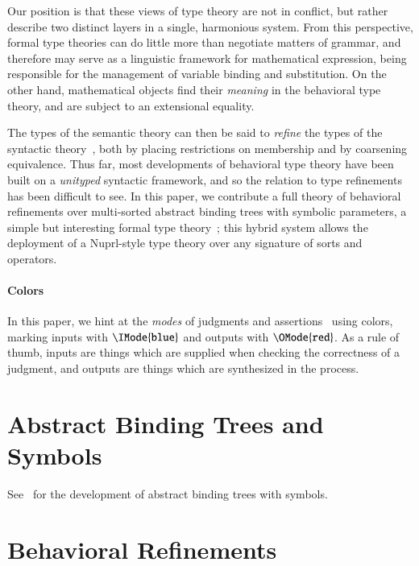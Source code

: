 \documentclass[11pt]{article}
\theoremstyle{definition}
\theoremstyle{notation}
\theoremstyle{remark}
\numberwithin{equation}{section}
\begin{document}
Our position is that these views of type theory are not in conflict, but rather
describe two distinct layers in a single, harmonious system. From this
perspective, formal type theories can do little more than negotiate matters of
grammar, and therefore may serve as a linguistic framework for mathematical
expression, being responsible for the management of variable binding and
substitution. On the other hand, mathematical objects find their \emph{meaning}
in the behavioral type theory, and are subject to an extensional equality.

The types of the semantic theory can then be said to \emph{refine} the types of
the syntactic theory~\cite{harper-davies:2014, harper-duff:2015, harper:2016},
both by placing restrictions on membership and by coarsening equivalence. Thus
far, most developments of behavioral type theory have been built on a
\emph{unityped} syntactic framework, and so the relation to type refinements
has been difficult to see. In this paper, we contribute a full theory of
behavioral refinements over multi-sorted abstract binding trees with symbolic
parameters, a simple but interesting formal type theory~\cite{harper:2016,
sterling-morrison:2015}; this hybrid system allows the deployment of a
Nuprl-style type theory over any signature of sorts and operators.

\ifcolored%
\paragraph{Colors}
In this paper, we hint at the \emph{modes} of judgments and
assertions~\cite{harper:2016} using colors, marking inputs with
$\IMode{\texttt{blue}}$ and outputs with $\OMode{\texttt{red}}$. As a rule of
thumb, inputs are things which are supplied when checking the correctness of a
judgment, and outputs are things which are synthesized in the process. \fi

\section{Abstract Binding Trees and Symbols}

See~\cite{sterling-morrison:2015} for the development of abstract binding trees
with symbols. 

\section{Behavioral Refinements}
\end{document}
